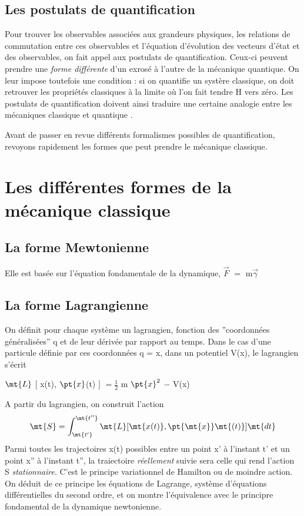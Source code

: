 \subsection{Les postulats de quantification}
Pour trouver les observables associées aux grandeurs physiques,
les relations de commutation entre
ces observables et l'équation d'évolution des vecteurs d'état et des
observables, on fait appel aux postulats de quantification. Ceux-ci
peuvent prendre une {\it forme différente} d'un exrosé à l'autre de la
mécanique quantique. On leur impose toutefois une condition : si on
quantifie un systère classique, on doit retrouver les propriétés classiques
à la limite où l'on fait tendre H vers zéro. Les postulats de
quantification doivent ainsi traduire une certaine analogie entre les
mécaniques classique et quantique .

Avant de passer en revue différents formalismes possibles de
quantification, revoyons rapidement les formes que peut prendre le
mécanique classique.
\section{Les différentes formes de la mécanique classique}

\subsection{La forme Mewtonienne}
Elle est basée sur l'équation fondamentale de la dynamique, $\vec{F}$ $=$ m$\vec{\gamma}$

\subsection{La forme Lagrangienne}
On définit pour chaque système un lagrangien,
fonction des ''coordonnées généralisées'' q et de leur dérivée par rapport
au temps. Dans le cas d'une particule définie par ces coordonnées q = x,
dans un potentiel V(x), le lagrangien s'écrit

\begin{center}
$\mt{L}$ $[$ x(t), $\pt{x}$(t) $]$ $= \frac{1}{2}$ m $\pt{x}^2$ $-$ V(x) 
\end{center}
A partir du lagrangien, on construit l'action
\[
\mt{S} = \int_\mt{t'}^\mt{t''} \mt{L} [ \mt{x(t)}, \pt{\mt{x}}\mt{(t)} ] \mt{dt}
\]
Parmi toutes les trajectoires x(t) possibles entre un point
x' à l'instant t' et un point x'' à l'instant t'', la traiectoire {\it réellement} suivie sera celle qui rend l'action S {\it stationnaire}. C'est le principe variationnel de Hamilton ou de moindre action. On déduit de ce
principe les équations de Lagrange, système d'équations différentielles
du second ordre, et on montre l'équivalence avec le principre fondamental
de la dynamique newtonienne.

